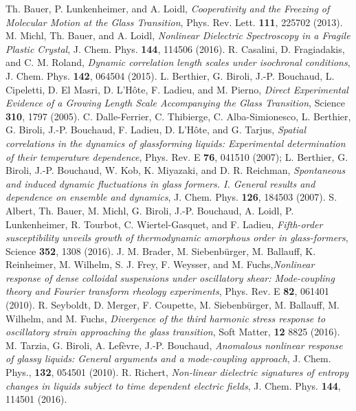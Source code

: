 \documentclass[single column,pre]{revtex4}
\begin{document}
\begin{thebibliography}{99}
 Th. Bauer, P. Lunkenheimer, and A. Loidl, \textit{Cooperativity and the Freezing of Molecular Motion at the Glass Transition}, Phys. Rev. Lett. {\bf 111}, 225702 (2013).
 M. Michl, Th. Bauer, and A. Loidl, \textit{Nonlinear Dielectric Spectroscopy in a Fragile Plastic Crystal}, J. Chem. Phys. {\bf 144}, 114506 (2016).
 R. Casalini, D. Fragiadakis, and C. M. Roland, \textit{Dynamic correlation length scales under isochronal conditions}, J. Chem. Phys. {\bf  142}, 064504 (2015).
 L. Berthier, G. Biroli, J.-P. Bouchaud, L. Cipeletti, D. El Masri, D. L'H\^ote, F. Ladieu, and M. Pierno, \textit{Direct Experimental Evidence of a Growing Length Scale Accompanying the Glass Transition}, Science {\bf 310}, 1797 (2005).
 C. Dalle-Ferrier, C. Thibierge, C. Alba-Simionesco, L. Berthier, G. Biroli, J.-P. Bouchaud, F. Ladieu,  D. L'H\^ote, and G. Tarjus, \textit{Spatial correlations in the dynamics of glassforming liquids:
Experimental determination of their temperature dependence}, Phys. Rev. E {\bf 76}, 041510 (2007); L. Berthier, G. Biroli, J.-P. Bouchaud, W. Kob, K. Miyazaki, and D. R. Reichman, \textit{Spontaneous and induced dynamic fluctuations in glass formers. I. General results and dependence on ensemble and dynamics}, J. Chem. Phys. {\bf 126}, 184503 (2007).
 S. Albert, Th. Bauer, M. Michl, G. Biroli, J.-P. Bouchaud, A. Loidl, P. Lunkenheimer, R. Tourbot, C. Wiertel-Gasquet, and F. Ladieu, \textit{Fifth-order susceptibility unveils growth of thermodynamic amorphous order in glass-formers}, Science {\bf 352}, 1308 (2016).
 J. M. Brader, M. Siebenb\"urger, M. Ballauff, K. Reinheimer, M. Wilhelm, S. J. Frey, F. Weysser, and M. Fuchs,\textit{Nonlinear response of dense colloidal suspensions under oscillatory shear: Mode-coupling theory and Fourier transform rheology experiments}, Phys. Rev. E {\bf 82}, 061401 (2010).
 R. Seyboldt, D. Merger, F. Coupette, M. Siebenb\"urger, M. Ballauff, M. Wilhelm, and M. Fuchs, \textit{Divergence of the third harmonic stress response to oscillatory strain approaching the glass transition}, Soft Matter, {\bf 12} 8825 (2016).
 M. Tarzia, G. Biroli, A. Lef\`evre, J.-P. Bouchaud, \textit{Anomalous nonlinear response of glassy liquids: General arguments and a mode-coupling approach}, J. Chem. Phys., {\bf 132}, 054501 (2010).
 R. Richert, \textit{Non-linear dielectric signatures of entropy changes in liquids subject to time dependent electric fields}, J. Chem. Phys. {\bf 144}, 114501 (2016).

\end{thebibliography}
\end{document}
